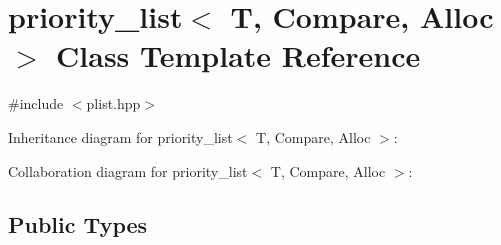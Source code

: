 \hypertarget{classpriority__list}{}\section{priority\+\_\+list$<$ T, Compare, Alloc $>$ Class Template Reference}
\label{classpriority__list}


{\ttfamily \#include $<$plist.\+hpp$>$}



Inheritance diagram for priority\+\_\+list$<$ T, Compare, Alloc $>$\+:


Collaboration diagram for priority\+\_\+list$<$ T, Compare, Alloc $>$\+:
\subsection*{Public Types}
